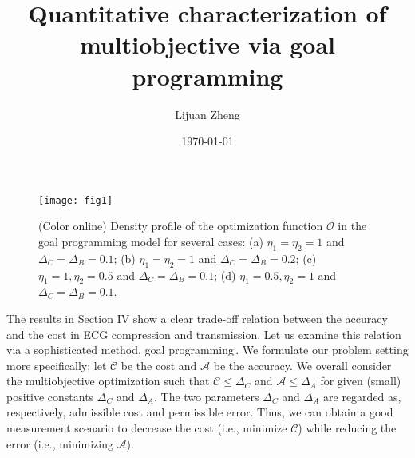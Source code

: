\documentclass[aps,pra,twocolumn,showpacs,superscriptaddress,groupedaddress]{revtex4}  %
\begin{document}
\title{Quantitative characterization of multiobjective via
 goal programming}

\author{Lijuan Zheng}
\address{
South China University of Technology, Guangzhou 510641, China}

\date{\today}


%
 \maketitle



\begin{figure}
\setlength{\abovecaptionskip}{7pt}
\texttt{[image: fig1]}
\caption{(Color online)  Density profile of the optimization function
 $\mathcal{O}$ in the goal programming model for several
 cases: (a) $\eta_1=\eta_2=1$ and $\Delta_C=\Delta_B=0.1$; (b)
 $\eta_1=\eta_2=1$ and $\Delta_C=\Delta_B=0.2$; (c) $\eta_1=1,
 \eta_2=0.5$ and $\Delta_C=\Delta_B=0.1$; (d) $\eta_1=0.5, \eta_2=1$ and
 $\Delta_C=\Delta_B=0.1$.}
\end{figure}

The results in Section IV show a clear trade-off relation
between the accuracy and the cost in ECG compression and transmission.
Let us examine this relation via a sophisticated method, goal
programming\,\cite{Goal}.
We formulate our problem setting more specifically; let $\mathcal{C}$ be the cost and $\mathcal{A}$ be the accuracy.
We overall consider the multiobjective optimization 
 such that $\mathcal{C} \le \Delta_{C}$ and $\mathcal{A} \le \Delta_{A}$ for given
(small) positive constants $\Delta_{C}$ and $\Delta_{A}$.
The two parameters $\Delta_{C}$ and $\Delta_{A}$ are regarded as,
respectively, admissible cost and permissible error.
Thus, we can obtain a good measurement scenario to decrease the cost (i.e., minimize $\mathcal{C}$) while reducing the error (i.e.,
minimizing $\mathcal{A}$).
\end{document}
